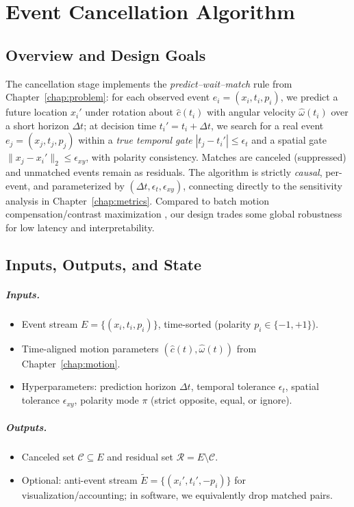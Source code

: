 \chapter{Event Cancellation Algorithm}
\label{chap:cancellation}

\section{Overview and Design Goals}
The cancellation stage implements the \emph{predict–wait–match} rule from Chapter~\ref{chap:problem}: for each observed event $e_i=(x_i,t_i,p_i)$, we predict a future location $x_i'$ under rotation about $\hat c(t_i)$ with angular velocity $\hat\omega(t_i)$ over a short horizon $\Delta t$; at decision time $t_i' = t_i+\Delta t$, we search for a real event $e_j=(x_j,t_j,p_j)$ within a \emph{true temporal gate} $|t_j-t_i'| \le \epsilon_t$ and a spatial gate $\|x_j-x_i'\|_2 \le \epsilon_{xy}$, with polarity consistency. Matches are canceled (suppressed) and unmatched events remain as residuals. The algorithm is strictly \emph{causal}, per-event, and parameterized by $(\Delta t,\epsilon_t,\epsilon_{xy})$, connecting directly to the sensitivity analysis in Chapter~\ref{chap:metrics}. Compared to batch motion compensation/contrast maximization \cite{Gallego2018CMax,Stoffregen2019Segmentation,Bardow2016SOFIE}, our design trades some global robustness for low latency and interpretability.

\section{Inputs, Outputs, and State}
\paragraph{Inputs.}
\begin{itemize}
    \item Event stream $E=\{(x_i,t_i,p_i)\}$, time-sorted (polarity $p_i\in\{-1,+1\}$).
    \item Time-aligned motion parameters $(\hat c(t),\hat\omega(t))$ from Chapter~\ref{chap:motion}.
    \item Hyperparameters: prediction horizon $\Delta t$, temporal tolerance $\epsilon_t$, spatial tolerance $\epsilon_{xy}$, polarity mode $\pi$ (strict opposite, equal, or ignore).
\end{itemize}

\paragraph{Outputs.}
\begin{itemize}
    \item Canceled set $\mathcal{C}\subseteq E$ and residual set $\mathcal{R}=E\setminus \mathcal{C}$.
    \item Optional: anti-event stream $\tilde E=\{(x_i',t_i',-p_i)\}$ for visualization/accounting; in software, we equivalently drop matched pairs.
\end{itemize}

